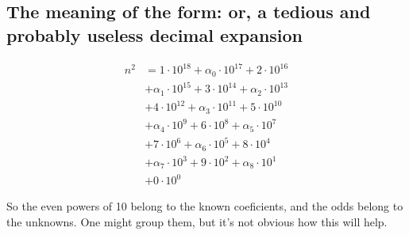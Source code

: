 \subsection{The meaning of the form: or, a tedious and probably useless decimal expansion}

\begin{align*}
    n^2 &= 1 \cdot 10^{18} + \alpha_0 \cdot 10^{17} + 2 \cdot 10^{16} \\
        &+ \alpha_1 \cdot 10^{15} + 3 \cdot 10^{14} + \alpha_2 \cdot 10^{13} \\
        &+ 4 \cdot 10^{12} + \alpha_3 \cdot 10^{11} + 5 \cdot 10^{10} \\
        &+ \alpha_4 \cdot 10^{9} + 6 \cdot 10^{8} + \alpha_5 \cdot 10^{7} \\
        &+ 7 \cdot 10^{6} + \alpha_6 \cdot 10^{5} + 8 \cdot 10^{4} \\
        &+ \alpha_7 \cdot 10^{3} + 9 \cdot 10^{2} + \alpha_8 \cdot 10^{1} \\
        &+ 0 \cdot 10^{0} 
\end{align*}

So the even powers of 10 belong to the known coeficients, and the odds belong to the unknowns.  One might group
them, but it's not obvious how this will help.